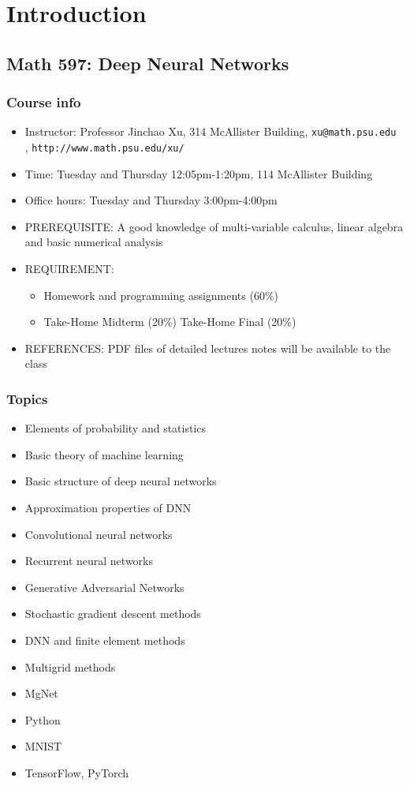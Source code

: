  \chapter{Introduction}

\section{Math 597:  Deep Neural Networks}

\subsection*{Course info}
\begin{itemize}
\item Instructor:  Professor Jinchao Xu, 314 McAllister Building, {\color{blue}\tt xu@math.psu.edu }, {\color{blue}\tt http://www.math.psu.edu/xu/}
\item Time: Tuesday and Thursday 12:05pm-1:20pm, 114 McAllister Building
\item Office hours: Tuesday and Thursday 3:00pm-4:00pm
\item PREREQUISITE:
A good knowledge of multi-variable calculus, linear
algebra and basic numerical analysis

\item REQUIREMENT: $\quad$

  \begin{itemize}
  \item Homework and programming assignments  (60\%)
\item Take-Home Midterm (20\%) Take-Home Final (20\%)
  \end{itemize}
\item REFERENCES: PDF files of detailed lectures notes will be available to
the  class
\end{itemize}


\subsection*{Topics}
\begin{itemize}
\item Elements of probability and statistics
\item Basic theory of machine learning
\item Basic structure of deep neural networks
\item Approximation properties of DNN
\item Convolutional neural networks
\item Recurrent neural networks
\item Generative Adversarial Networks
\item Stochastic gradient descent methods
\item DNN and finite element methods
\item Multigrid methods
\item MgNet
\item Python
\item MNIST
\item TensorFlow, PyTorch
\end{itemize}


